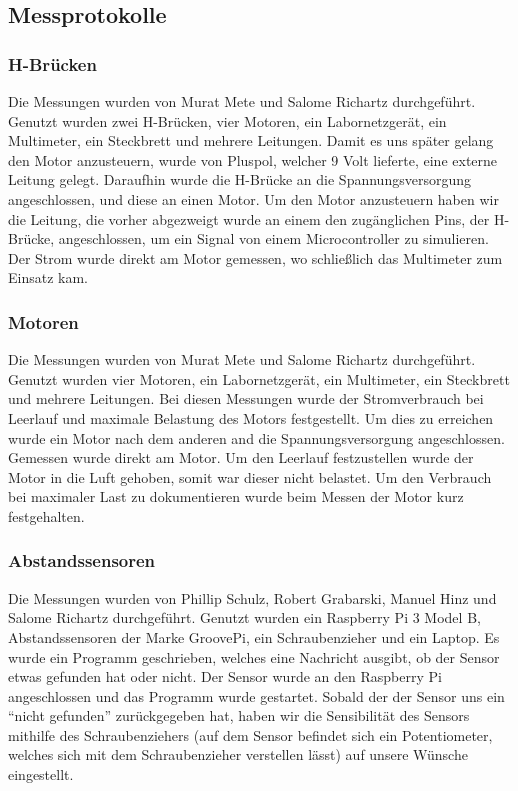 \documentclass[notitlepage]{report}
\begin{document}
\subsection{Messprotokolle}

\subsubsection{H-Br\"{u}cken}
Die Messungen wurden von Murat Mete und Salome Richartz durchgef\"{u}hrt. Genutzt wurden zwei H-Br\"{u}cken, vier Motoren, ein Labornetzger\"{a}t, ein Multimeter, ein Steckbrett und mehrere Leitungen. Damit es uns sp\"{a}ter gelang den Motor anzusteuern, wurde von Pluspol, welcher 9 Volt lieferte, eine externe Leitung gelegt. Daraufhin wurde die H-Br\"{u}cke an die Spannungsversorgung angeschlossen, und diese an einen Motor. Um den Motor anzusteuern haben wir die Leitung, die vorher abgezweigt wurde an einem den zug\"{a}nglichen Pins, der H-Br\"{u}cke, angeschlossen, um ein Signal von einem Microcontroller zu simulieren. Der Strom wurde direkt am Motor gemessen, wo schlie{\ss}lich das Multimeter zum Einsatz kam.

\subsubsection{Motoren}

Die Messungen wurden von Murat Mete und Salome Richartz durchgef\"{u}hrt. Genutzt wurden vier Motoren, ein Labornetzger\"{a}t, ein Multimeter, ein Steckbrett und mehrere Leitungen. Bei diesen Messungen wurde der Stromverbrauch bei Leerlauf und maximale Belastung des Motors festgestellt. Um dies zu erreichen wurde ein Motor nach dem anderen and die Spannungsversorgung angeschlossen. Gemessen wurde direkt am Motor. Um den Leerlauf festzustellen wurde der Motor in die Luft gehoben, somit war dieser nicht belastet. Um den Verbrauch bei maximaler Last zu dokumentieren wurde beim Messen der Motor kurz festgehalten.

\subsubsection{Abstandssensoren}

Die Messungen wurden von Phillip Schulz, Robert Grabarski, Manuel Hinz und Salome Richartz durchgef\"{u}hrt. Genutzt wurden ein Raspberry Pi 3 Model B, Abstandssensoren der Marke GroovePi, ein Schraubenzieher und ein Laptop. Es wurde ein Programm geschrieben, welches eine Nachricht ausgibt, ob der Sensor etwas gefunden hat oder nicht. Der Sensor wurde an den Raspberry Pi angeschlossen und das Programm wurde gestartet. Sobald der der Sensor uns ein “nicht gefunden” zur\"{u}ckgegeben hat, haben wir die Sensibilit\"{a}t des Sensors mithilfe des Schraubenziehers (auf dem Sensor befindet sich ein Potentiometer, welches sich mit dem Schraubenzieher verstellen l\"{a}sst) auf unsere W\"{u}nsche eingestellt.
\end{document}
